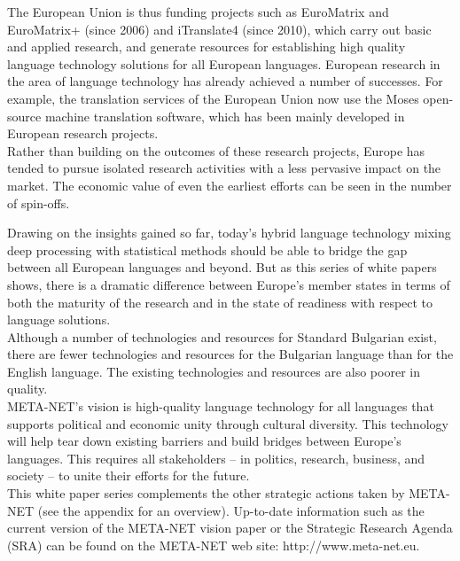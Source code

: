 \begin{multicols}{2}

  The European Union is thus funding projects such as EuroMatrix and EuroMatrix+ (since 2006) and iTranslate4 (since 2010), which carry out basic and applied research, and generate resources for establishing high quality language technology solutions for all European languages. 
  European research in the area of language technology has already achieved a number of successes. For example, the translation services of the European Union now use the Moses open-source machine translation software, which has been mainly developed in European research projects. \\
  Rather than building on the outcomes of these research projects, Europe has tended to pursue isolated research activities with a less pervasive impact on the market. The economic value of even the earliest efforts can be seen in the number of spin-offs. 


  Drawing on the insights gained so far, today’s hybrid language technology mixing deep processing with statistical methods should be able to bridge the gap between all European languages and beyond. But as this series of white papers shows, there is a dramatic difference between Europe’s
  member states in terms of both the maturity of the research and in the state of readiness with respect to language solutions.\\
  Although a number of technologies and resources for Standard Bulgarian exist, there are fewer technologies and resources for the Bulgarian language than for the English language. The existing technologies and resources are also poorer in quality.\\
  META-NET’s vision is high-quality language technology for all languages that supports political and economic unity through cultural diversity. This technology will help tear down existing barriers and build bridges between Europe’s languages. This requires all stakeholders -- in politics, research, business, and society -- to unite their efforts for the future.\\
  This white paper series complements the other strategic actions taken by META-NET (see the appendix for an overview). Up-to-date information such as the current version of the META-NET vision paper \cite{Meta1} or the Strategic Research Agenda (SRA) can be found on the META-NET web site: http://www.meta-net.eu.
  \end{multicols}

